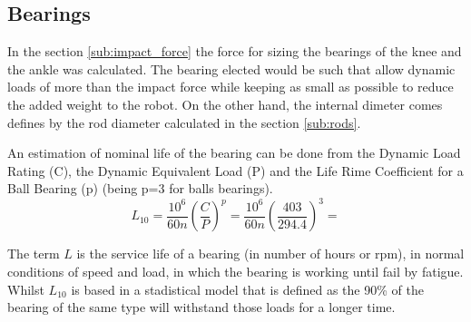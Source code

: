 
\subsection{Bearings} %
\label{sub:bearings}
In the section \ref{sub:impact_force} the force for sizing the bearings of the knee and the ankle was calculated.
The bearing elected would be such that allow dynamic loads of more than the impact force while keeping as small as possible to reduce the added weight to the robot.
On the other hand, the internal dimeter comes defines by the rod diameter calculated in the section \ref{sub:rods}.

An estimation of nominal life of the bearing can be done from the Dynamic Load Rating (C), the Dynamic Equivalent Load (P) and the Life Rime Coefficient for a Ball Bearing (p) (being p=3 for balls bearings). 
\begin{equation}
  L_{10} = \frac{10^{6}}{60 n} \left(\frac{C}{P}\right)^{p} = \frac{10^{6}}{60 n} \left(\frac{403}{294.4}\right)^{3} = 
\end{equation}

The term $L$ is the service life of a bearing (in number of hours or rpm), in normal conditions of speed and load, in which the bearing is working until fail by fatigue. 
Whilst $L_{10}$ is based in a stadistical model that is defined as the 90\% of the bearing of the same type will withstand those loads for a longer time.
